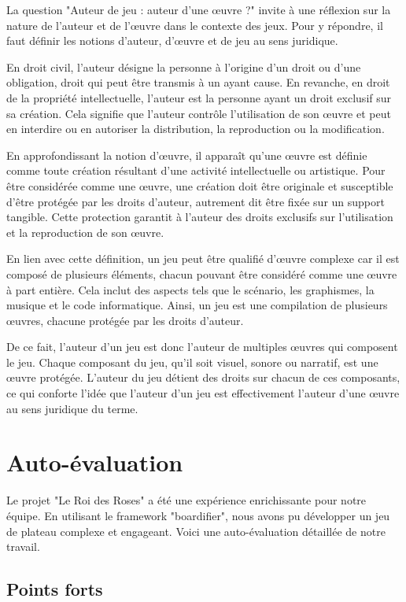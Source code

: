 La question "Auteur de jeu : auteur d'une œuvre ?" invite à une réflexion sur la nature de l'auteur et de l'œuvre dans le contexte des jeux. Pour y répondre, il faut définir les notions d'auteur, d'œuvre et de jeu au sens juridique.

En droit civil, l'auteur désigne la personne à l'origine d'un droit ou d'une obligation, droit qui peut être transmis à un ayant cause. En revanche, en droit de la propriété intellectuelle, l'auteur est la personne ayant un droit exclusif sur sa création. Cela signifie que l'auteur contrôle l'utilisation de son œuvre et peut en interdire ou en autoriser la distribution, la reproduction ou la modification.

En approfondissant la notion d'œuvre, il apparaît qu'une œuvre est définie comme toute création résultant d'une activité intellectuelle ou artistique. Pour être considérée comme une œuvre, une création doit être originale et susceptible d'être protégée par les droits d'auteur, autrement dit être fixée sur un support tangible. Cette protection garantit à l'auteur des droits exclusifs sur l'utilisation et la reproduction de son œuvre.

En lien avec cette définition, un jeu peut être qualifié d'œuvre complexe car il est composé de plusieurs éléments, chacun pouvant être considéré comme une œuvre à part entière. Cela inclut des aspects tels que le scénario, les graphismes, la musique et le code informatique. Ainsi, un jeu est une compilation de plusieurs œuvres, chacune protégée par les droits d'auteur.

De ce fait, l'auteur d'un jeu est donc l'auteur de multiples œuvres qui composent le jeu. Chaque composant du jeu, qu'il soit visuel, sonore ou narratif, est une œuvre protégée. L'auteur du jeu détient des droits sur chacun de ces composants, ce qui conforte l'idée que l'auteur d'un jeu est effectivement l'auteur d'une œuvre au sens juridique du terme.

\section{Auto-évaluation}

Le projet "Le Roi des Roses" a été une expérience enrichissante pour notre équipe. En utilisant le framework "boardifier", nous avons pu développer un jeu de plateau complexe et engageant. Voici une auto-évaluation détaillée de notre travail.

\subsection{Points forts}

